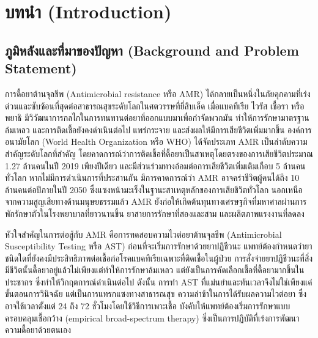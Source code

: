 \chapter{บทนำ (Introduction)}

\section{ภูมิหลังและที่มาของปัญหา (Background and Problem Statement)}

การดื้อยาต้านจุลชีพ (Antimicrobial resistance หรือ AMR) ได้กลายเป็นหนึ่งในภัยคุกคามที่เร่งด่วนและซับซ้อนที่สุดต่อสาธารณสุขระดับโลกในศตวรรษที่ยี่สิบเอ็ด เมื่อแบคทีเรีย ไวรัส เชื้อรา หรือพยาธิ มีวิวัฒนาการกลไกในการทนทานต่อยาที่ออกแบบมาเพื่อกำจัดพวกมัน ทำให้การรักษามาตรฐานล้มเหลว และการติดเชื้อยังคงดำเนินต่อไป แพร่กระจาย และส่งผลให้มีการเสียชีวิตเพิ่มมากขึ้น องค์การอนามัยโลก (World Health Organization หรือ WHO) ได้จัดประเภท AMR เป็นลำดับความสำคัญระดับโลกที่สำคัญ โดยคาดการณ์ว่าการติดเชื้อที่ดื้อยาเป็นสาเหตุโดยตรงของการเสียชีวิตประมาณ 1.27 ล้านคนในปี 2019 เพียงปีเดียว และมีส่วนร่วมทางอ้อมต่อการเสียชีวิตเพิ่มเติมเกือบ 5 ล้านคนทั่วโลก \cite{who_amr2022} หากไม่มีการดำเนินการที่ประสานกัน มีการคาดการณ์ว่า AMR อาจคร่าชีวิตผู้คนได้ถึง 10 ล้านคนต่อปีภายในปี 2050 ซึ่งแซงหน้ามะเร็งในฐานะสาเหตุหลักของการเสียชีวิตทั่วโลก นอกเหนือจากความสูญเสียทางด้านมนุษยธรรมแล้ว AMR ยังก่อให้เกิดต้นทุนทางเศรษฐกิจที่มหาศาลผ่านการพักรักษาตัวในโรงพยาบาลที่ยาวนานขึ้น ยาสายการรักษาที่สองและสาม และผลิตภาพแรงงานที่ลดลง

หัวใจสำคัญในการต่อสู้กับ AMR คือการทดสอบความไวต่อยาต้านจุลชีพ (Antimicrobial Susceptibility Testing หรือ AST) ก่อนที่จะเริ่มการรักษาด้วยยาปฏิชีวนะ แพทย์ต้องกำหนดว่ายาชนิดใดที่ยังคงมีประสิทธิภาพต่อเชื้อก่อโรคแบคทีเรียเฉพาะที่ติดเชื้อในผู้ป่วย การสั่งจ่ายยาปฏิชีวนะที่สิ่งมีชีวิตนั้นดื้อยาอยู่แล้วไม่เพียงแต่ทำให้การรักษาล้มเหลว แต่ยังเป็นการคัดเลือกเชื้อที่ดื้อยามากขึ้นในประชากร ซึ่งทำให้วิกฤตการณ์ดำเนินต่อไป ดังนั้น การทำ AST ที่แม่นยำและทันเวลาจึงไม่ใช่เพียงแค่ขั้นตอนการวินิจฉัย แต่เป็นการแทรกแซงทางสาธารณสุข ความล่าช้าในการได้รับผลความไวต่อยา ซึ่งอาจใช้เวลาตั้งแต่ 24 ถึง 72 ชั่วโมงโดยใช้วิธีการเพาะเชื้อ บังคับให้แพทย์ต้องเริ่มการรักษาแบบครอบคลุมเชื้อกว้าง (empirical broad-spectrum therapy) ซึ่งเป็นการปฏิบัติที่เร่งการพัฒนาความดื้อยาด้วยตนเอง

